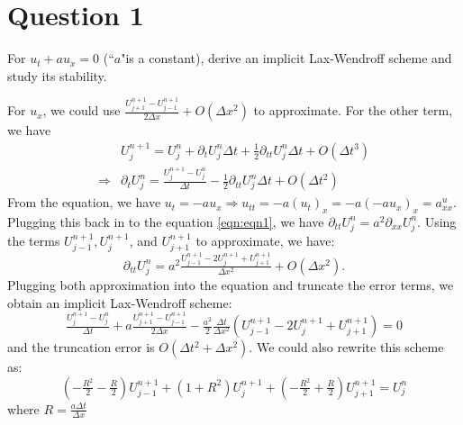 \section{Question 1}

\begin{question}
    For $u_t+a u_x=0$ (``$a$"is a constant),
    derive an implicit Lax-Wendroff scheme and study its stability.
\end{question}

\begin{answer}
    For $u_x$, we could use $\tfrac{U_{j+1}^{n+1} - U_{j-1}^{n+1}}{2\Delta x} + O(\Delta x^2)$ to approximate. For the other term, we have
    \begin{equation}\label{eqn:eqn1}
        \begin{aligned}
            &U_j^{n+1} = U_j^n + \partial_tU_j^n\Delta t + \tfrac{1}{2}\partial_{tt}U_j^n\Delta t + O(\Delta t^3)\\
            \Rightarrow &\partial_t U_j^n = \tfrac{U_j^{n+1} - U_j^n}{\Delta t} - \tfrac{1}{2}\partial_{tt}U_j^n \Delta t + O(\Delta t^2)
        \end{aligned}
    \end{equation}
    From the equation, we have $u_t = -au_x \Rightarrow u_{tt} = -a(u_t)_x = -a(-au_x)_x = a^u_{xx}$. Plugging this back in to the equation \ref{eqn:eqn1}, we have $\partial_{tt}U_j^n = a^2 \partial_{xx}U_j^n$. Using the terms $U_{j-1}^{n+1}, U_{j}^{n+1}$, and $U_{j+1}^{n+1}$ to approximate, we have:
    \begin{equation}
        \partial_{tt}U_j^n = a^2 \tfrac{U_{j-1}^{n+1} - 2U_j^{n+1} + U_{j+1}^{n+1}}{\Delta x^2} + O(\Delta x^2).
    \end{equation}
    Plugging both approximation into the equation and truncate the error terms, we obtain an implicit Lax-Wendroff scheme:
    \begin{equation}\label{eqn:eqn2}
        \tfrac{U_j^{n+1} - U_j^n}{\Delta t} + a \tfrac{U_{j+1}^{n+1}-U_{j-1}^{n+1}}{2\Delta x} - \tfrac{a^2}{2} \tfrac{\Delta t}{\Delta x^2} (U_{j-1}^{n+1} - 2U_{j}^{n+1} + U_{j+1}^{n+1}) = 0
    \end{equation}
    and the truncation error is $O(\Delta t^2 + \Delta x^2)$. We could also rewrite this scheme as:
    \begin{equation}
        (-\tfrac{R^2}{2} - \tfrac{R}{2})U_{j-1}^{n+1} + (1 + R^2)U_j^{n+1} + (-\tfrac{R^2}{2} + \tfrac{R}{2})U_{j+1}^{n+1} = U_j^n
    \end{equation}
    where $R = \tfrac{a\Delta t}{\Delta x}$
    

\end{answer}
